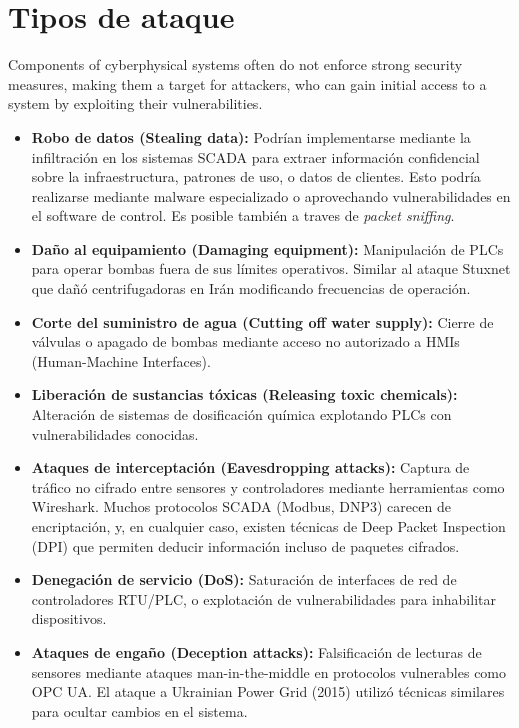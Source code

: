 \section{Tipos de ataque}
Components of cyberphysical systems often do not enforce strong security measures, making them a target for attackers, who can gain initial access to a system by exploiting their vulnerabilities.     
\begin{itemize}
   \item \textbf{Robo de datos (Stealing data):} Podrían implementarse mediante la infiltración en los sistemas SCADA para extraer información confidencial sobre la infraestructura, patrones de uso, o datos de clientes. Esto podría realizarse mediante malware especializado o aprovechando vulnerabilidades en el software de control. Es posible también a traves de \textit{packet sniffing}. 
   
   \item \textbf{Daño al equipamiento (Damaging equipment):} Manipulación de PLCs para operar bombas fuera de sus límites operativos. Similar al ataque Stuxnet que dañó centrifugadoras en Irán modificando frecuencias de operación.
   
   \item \textbf{Corte del suministro de agua (Cutting off water supply):} Cierre de válvulas o apagado de bombas mediante acceso no autorizado a HMIs (Human-Machine Interfaces).
   
   \item \textbf{Liberación de sustancias tóxicas (Releasing toxic chemicals):} Alteración de sistemas de dosificación química explotando PLCs con vulnerabilidades conocidas.
   
   \item \textbf{Ataques de interceptación (Eavesdropping attacks):} Captura de tráfico no cifrado entre sensores y controladores mediante herramientas como Wireshark. Muchos protocolos SCADA (Modbus, DNP3) carecen de encriptación, y, en cualquier caso, existen técnicas de Deep Packet Inspection (DPI) que permiten deducir información incluso de paquetes cifrados.\\
   
   \item \textbf{Denegación de servicio (DoS):} Saturación de interfaces de red de controladores RTU/PLC, o explotación de vulnerabilidades para inhabilitar dispositivos.
   
   \item \textbf{Ataques de engaño (Deception attacks):} Falsificación de lecturas de sensores mediante ataques man-in-the-middle en protocolos vulnerables como OPC UA. El ataque a Ukrainian Power Grid (2015) utilizó técnicas similares para ocultar cambios en el sistema.
\end{itemize}

